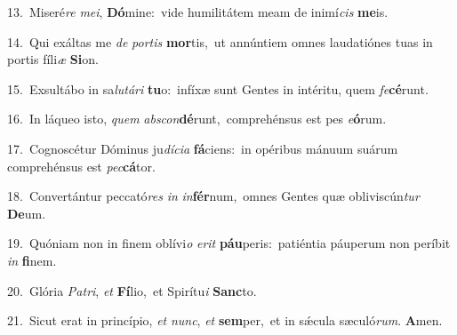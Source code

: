 {\numbfont\textcolor{\numbcolor}{13.}}~Miseré\textit{re} \textit{me}\-\textit{i}, \textbf{Dó}\-mine:~\star vide humilitátem meam de inimí\textit{cis} \textbf{me}\-is.\par
{\numbfont\textcolor{\numbcolor}{14.}}~Qui exáltas me \textit{de} \textit{por}\-\textit{tis} \textbf{mor}\-tis,~\star ut annúntiem omnes laudatiónes tuas in portis fíli\textit{æ} \textbf{Si}\-on.\par
{\numbfont\textcolor{\numbcolor}{15.}}~Exsultábo in sa\-\textit{lu}\-\textit{tá}\textit{ri} \textbf{tu}\-o:~\star infíxæ sunt Gentes in intéritu, quem \textit{fe}\-\textbf{cé}runt.\par
{\numbfont\textcolor{\numbcolor}{16.}}~In láqueo isto, \textit{quem} \textit{abs}\-\textit{con}\textbf{dé}runt,~\star comprehénsus est pes \textit{e}\-\textbf{ó}rum.\par
{\numbfont\textcolor{\numbcolor}{17.}}~Cognoscétur Dóminus ju\-\textit{dí}\-\textit{ci}\textit{a} \textbf{fá}\-ciens:~\star in opéribus mánuum suárum comprehénsus est \textit{pec}\-\textbf{cá}tor.\par
{\numbfont\textcolor{\numbcolor}{18.}}~Convertántur peccató\textit{res} \textit{in} \textit{in}\-\textbf{fér}num,~\star omnes Gentes quæ obliviscún\textit{tur} \textbf{De}\-um.\par
{\numbfont\textcolor{\numbcolor}{19.}}~Quóniam non in finem oblívi\textit{o} \textit{e}\-\textit{rit} \textbf{páu}\-peris:~\star patiéntia páuperum non períbit \textit{in} \textbf{fi}\-nem.\par
{\numbfont\textcolor{\numbcolor}{20.}}~Glória \textit{Pa}\-\textit{tri}, \textit{et} \textbf{Fí}\-lio,~\star et Spirítu\textit{i} \textbf{Sanc}\-to.\par
{\numbfont\textcolor{\numbcolor}{21.}}~Sicut erat in princípio, \textit{et} \textit{nunc}\-, \textit{et} \textbf{sem}\-per,~\star et in sǽcula sæculó\-\textit{rum}\-. \textbf{A}\-men.\par
